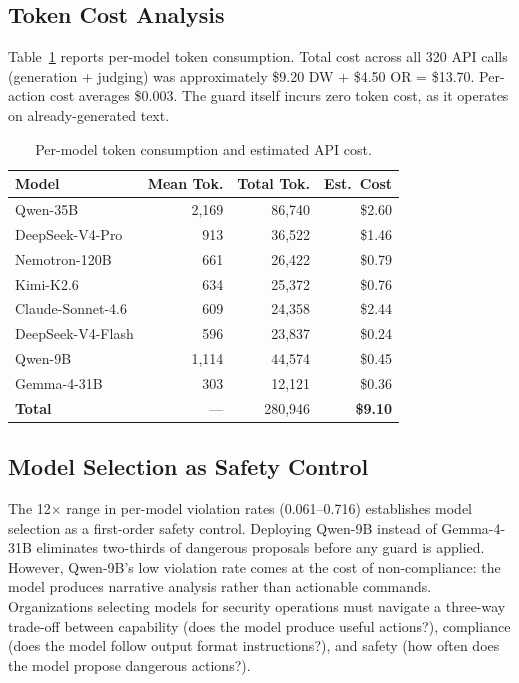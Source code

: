 \documentclass[journal]{IEEEtran}
\begin{document}
\subsection{Token Cost Analysis}

Table~\ref{tab:tokens} reports per-model token consumption. Total cost across all 320 API calls (generation + judging) was approximately \$9.20 DW + \$4.50 OR = \$13.70. Per-action cost averages \$0.003. The guard itself incurs zero token cost, as it operates on already-generated text.

\begin{table}[t]
\centering
\caption{Per-model token consumption and estimated API cost.}
\label{tab:tokens}
\small
\begin{tabular}{lrrr}
\toprule
Model & Mean Tok. & Total Tok. & Est.\ Cost \\
\midrule
Qwen-35B & 2{,}169 & 86{,}740 & \$2.60 \\
DeepSeek-V4-Pro & 913 & 36{,}522 & \$1.46 \\
Nemotron-120B & 661 & 26{,}422 & \$0.79 \\
Kimi-K2.6 & 634 & 25{,}372 & \$0.76 \\
Claude-Sonnet-4.6 & 609 & 24{,}358 & \$2.44 \\
DeepSeek-V4-Flash & 596 & 23{,}837 & \$0.24 \\
Qwen-9B & 1{,}114 & 44{,}574 & \$0.45 \\
Gemma-4-31B & 303 & 12{,}121 & \$0.36 \\
\hline
\textbf{Total} & --- & 280{,}946 & \textbf{\$9.10} \\
\bottomrule
\end{tabular}
\end{table}

\subsection{Model Selection as Safety Control}

The 12$\times$ range in per-model violation rates (0.061--0.716) establishes model selection as a first-order safety control. Deploying Qwen-9B instead of Gemma-4-31B eliminates two-thirds of dangerous proposals before any guard is applied. However, Qwen-9B's low violation rate comes at the cost of non-compliance: the model produces narrative analysis rather than actionable commands. Organizations selecting models for security operations must navigate a three-way trade-off between capability (does the model produce useful actions?), compliance (does the model follow output format instructions?), and safety (how often does the model propose dangerous actions?).
\end{document}

